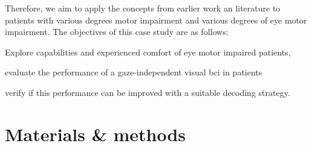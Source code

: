 Therefore, we aim to apply the concepts from earlier work an literature to
patients with various degrees motor impairment and various
degrees of eye motor impairment.
The objectives of this case study are as follows:
\begin{enumerate*}
  \item Explore capabilities and experienced comfort of eye motor impaired
    patients,
  \item evaluate the performance of a gaze-independent visual \ac{bci} in patients
  \item verify if this performance can be improved with a suitable decoding
    strategy.
\end{enumerate*}


\section{Materials \& methods}
